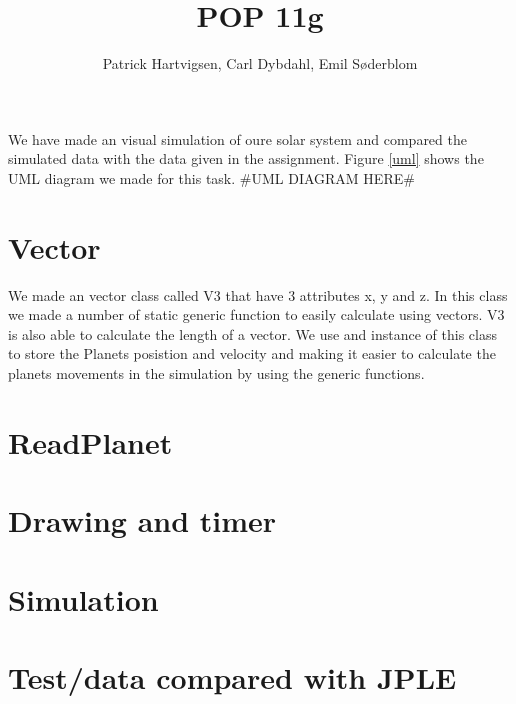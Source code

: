\documentclass[a4paper]{article}
\title{POP 11g}
\author{Patrick Hartvigsen, Carl Dybdahl, Emil Søderblom}
\begin{document}
\maketitle
We have made an visual simulation of oure solar system and compared the simulated data with the data given in the assignment.
Figure \ref{uml} shows the UML diagram we made for this task. 
#UML DIAGRAM HERE#

\section*{Vector}
We made an vector class called V3 that have 3 attributes x, y and z. In this class we made a number of static generic function to easily calculate using vectors. V3 is also able to calculate the length of a vector.
We use and instance of this class to store the Planets posistion and velocity and making it easier to calculate the planets movements in the simulation by using the generic functions. 

\section*{ReadPlanet}


\section*{Drawing and timer}


\section*{Simulation}

\section*{Test/data compared with JPLE}
\end{document}
